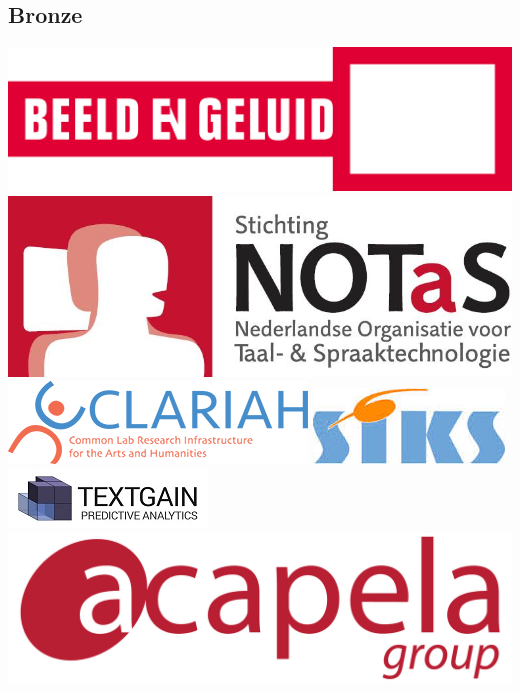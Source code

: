 \subsection{Bronze}
\includegraphics{logo_beeld_geluid}
\includegraphics{logo_NOTaS}
\includegraphics{logo_clariah}
\includegraphics{siks-logo}
\includegraphics{textgainlogo}
\includegraphics{logoAG_XL}
